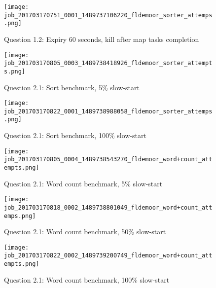 \begin{figure}[!ht]
    \centering
    \texttt{[image: job\_201703170751\_0001\_1489737106220\_fldemoor\_sorter\_attemps.png]}
    \caption{Question 1.2: Expiry 60 seconds, kill after map tasks completion}
    \label{1.2.60s.reduce}
\end{figure}
\newpage


\begin{figure}[!ht]
    \centering
    \texttt{[image: job\_201703170805\_0003\_1489738418926\_fldemoor\_sorter\_attempts.png]}
    \caption{Question 2.1: Sort benchmark, 5\% slow-start}
    \label{2.1.sort.5}
\end{figure}
\newpage

\begin{figure}[!ht]
    \centering
    \texttt{[image: job\_201703170822\_0001\_1489738988058\_fldemoor\_sorter\_attemps.png]}
    \caption{Question 2.1: Sort benchmark, 100\% slow-start}
    \label{2.1.sort.100}
\end{figure}
\newpage

\begin{figure}[!ht]
    \centering
    \texttt{[image: job\_201703170805\_0004\_1489738543270\_fldemoor\_word+count\_attempts.png]}
    \caption{Question 2.1: Word count benchmark, 5\% slow-start}
    \label{2.1.wc.5}
\end{figure}
\newpage

\begin{figure}[!ht]
    \centering
    \texttt{[image: job\_201703170818\_0002\_1489738801049\_fldemoor\_word+count\_attemps.png]}
    \caption{Question 2.1: Word count benchmark, 50\% slow-start}
    \label{2.1.wc.50}
\end{figure}
\newpage

\begin{figure}[!ht]
    \centering
    \texttt{[image: job\_201703170822\_0002\_1489739200749\_fldemoor\_word+count\_attempts.png]}
    \caption{Question 2.1: Word count benchmark, 100\% slow-start}
    \label{2.1.wc.100}
\end{figure}
\newpage
